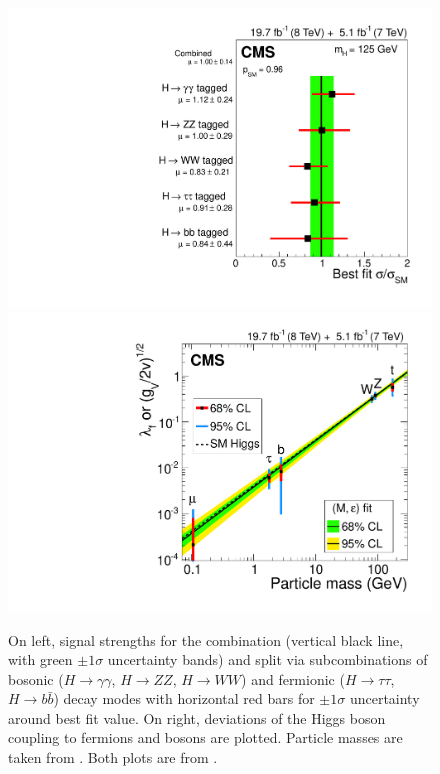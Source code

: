\begin{figure}[htbp]
\begin{center}
\includegraphics[width=.45\linewidth]{Conclusions/figures/sqr_mlz_ccc_mH125_decay.pdf}
\includegraphics[width=.45\linewidth]{Conclusions/figures/sqr_m6summary_fitmu.pdf}
\caption[Higgs Boson Signal Strength for CMS Combination Split by Decay Channel]{On left, signal strengths for the combination (vertical black line, with green $\pm1\sigma$ uncertainty bands) and split via subcombinations of bosonic ($H\rightarrow \gamma\gamma$, $H\rightarrow ZZ$, $H\rightarrow WW$) and fermionic ($H\rightarrow \tau\tau$, $H\rightarrow b\bar{b}$) decay modes with horizontal red bars for $\pm1\sigma$ uncertainty around best fit value. On right, deviations of the Higgs boson coupling to fermions and bosons are plotted. Particle masses are taken from \cite{Agashe:2014kda}. Both plots are from \cite{Khachatryan:2014jba}.}
\label{fig:CombHiggsDecay}
\end{center}
\end{figure}

